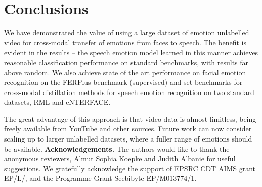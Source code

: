 \documentclass[sigconf]{acmart}
\begin{document}
 \section{Conclusions} We have demonstrated the value of using a large
dataset of emotion unlabelled video for cross-modal transfer of
emotions from faces to speech. The benefit is evident in the results
-- the speech emotion model learned in this manner achieves reasonable
classification performance on standard benchmarks, with results far
above random. We also achieve state of the art performance on facial
emotion recognition on the FERPlus benchmark (supervised) and set 
benchmarks for cross-modal distillation methods for speech emotion
recognition on two standard datasets, RML and eNTERFACE.

The great advantage of this approach is that video data is almost
limitless, being freely available from YouTube and other sources.
Future work can now consider scaling up to larger unlabelled datasets,
where a fuller range of emotions should be available. 
\noindent\textbf{Acknowledgements.}  The authors would like to thank
the anonymous reviewers, Almut Sophia Koepke and Judith Albanie for useful suggestions. 
We  gratefully acknowledge the support of EPSRC CDT AIMS grant
EP/L/,  and the Programme Grant Seebibyte EP/M013774/1.
 


\end{document}
